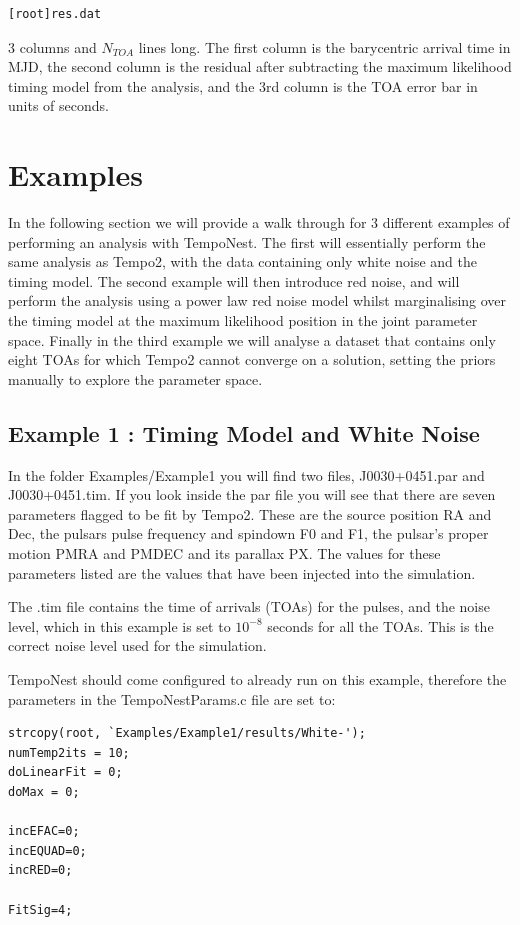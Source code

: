 \documentclass[%
 preprint,
 amsmath,amssymb,amsfonts,
 aps,
]{revtex4-1}
\begin{document}
\begin{lstlisting}
[root]res.dat
\end{lstlisting}
3 columns and $N_{TOA}$ lines long.  The first column is the barycentric arrival time in MJD, the second column is the residual after subtracting the maximum likelihood timing model from the analysis, and the 3rd column is the TOA error bar in units of seconds.


\section{Examples}
\label{Section:Example}

In the following section we will provide a walk through for 3 different examples of performing an analysis with TempoNest.  The first will essentially perform the same analysis as Tempo2, with the data containing only white noise and the timing model.  The second example will then introduce red noise, and will perform the analysis using a power law red noise model whilst marginalising over the timing model at the maximum likelihood position in the joint parameter space.  Finally in the third example we will analyse a dataset that contains only eight TOAs for which Tempo2 cannot converge on a solution, setting the priors manually to explore the parameter space.  


\subsection{Example 1 : Timing Model and White Noise}


In the folder Examples/Example1 you will find two files, J0030+0451.par and J0030+0451.tim.  If you look inside the par file you will see that there are seven parameters flagged to be fit by Tempo2.  These are the source position RA and Dec, the pulsars pulse frequency and spindown F0 and F1, the pulsar's proper motion PMRA and PMDEC and  its parallax PX.  The values for these parameters listed are the values that have been injected into the simulation.

The .tim file contains the time of arrivals (TOAs) for the pulses, and the noise level, which in this example is set to $10^{-8}$ seconds for all the TOAs.  This is the correct noise level used for the simulation.

TempoNest should come configured to already run on this example, therefore the parameters in the TempoNestParams.c file are set to:

\begin{lstlisting}
strcopy(root, `Examples/Example1/results/White-');
numTemp2its = 10;
doLinearFit = 0;
doMax = 0;

incEFAC=0;
incEQUAD=0;
incRED=0;

FitSig=4;
\end{lstlisting}
\end{document}
